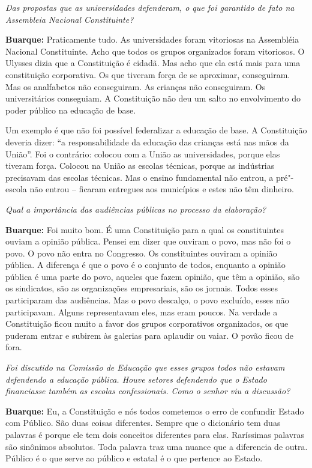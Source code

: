 \emph{Das propostas que as universidades defenderam, o que foi
garantido de fato na Assembleia Nacional Constituinte?}

\textbf{Buarque:} Praticamente tudo. As universidades foram vitoriosas
na Assembléia Nacional Constituinte. Acho que todos os grupos
organizados foram vitoriosos. O Ulysses dizia que a Constituição é
cidadã. Mas acho que ela está mais para uma constituição corporativa. Os
que tiveram força de se aproximar, conseguiram. Mas os analfabetos não
conseguiram. As crianças não conseguiram. Os universitários conseguiam.
A Constituição não deu um salto no envolvimento do poder público na
educação de base.

Um exemplo é que não foi possível federalizar a educação de base. A
Constituição deveria dizer: ``a responsabilidade da educação das
crianças está nas mãos da União''. Foi o contrário: colocou com a União
as universidades, porque elas tiveram força. Colocou na União as escolas
técnicas, porque as indústrias precisavam das escolas técnicas. Mas o
ensino fundamental não entrou, a pré"-escola não entrou -- ficaram
entregues aos municípios e estes não têm dinheiro.

\emph{Qual a importância das audiências públicas no processo da
elaboração?}

\textbf{Buarque:} Foi muito bom. É uma Constituição para a qual os
constituintes ouviam a opinião pública. Pensei em dizer que ouviram o
povo, mas não foi o povo. O povo não entra no Congresso. Os
constituintes ouviram a opinião pública. A diferença é que o povo é o
conjunto de todos, enquanto a opinião pública é uma parte do povo,
aqueles que fazem opinião, que têm a opinião, são os sindicatos, são as
organizações empresariais, são os jornais. Todos esses participaram das
audiências. Mas o povo descalço, o povo excluído, esses não
participavam. Alguns representavam eles, mas eram poucos. Na verdade a
Constituição ficou muito a favor dos grupos corporativos organizados, os
que puderam entrar e subirem às galerias para aplaudir ou vaiar. O povão
ficou de fora.

\emph{Foi discutido na Comissão de Educação que esses grupos todos não
estavam defendendo a educação pública. Houve setores defendendo que o
Estado financiasse também as escolas confessionais. Como o senhor viu a
discussão?}

\textbf{Buarque:} Eu, a Constituição e nós todos cometemos o erro de
confundir Estado com Público. São duas coisas diferentes. Sempre que o
dicionário tem duas palavras é porque ele tem dois conceitos diferentes
para elas. Raríssimas palavras são sinônimos absolutos. Toda palavra
traz uma nuance que a diferencia de outra. Público é o que serve ao
público e estatal é o que pertence ao Estado.

